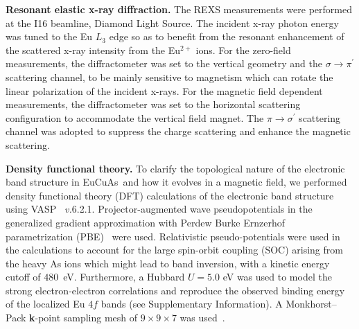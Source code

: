 \documentclass[aps,prl,amsmath,amssymb,amstext,citeautoscript,punctuation,nofootinbib,superscriptaddress,twocolumn]{revtex4-1}
\newcommand{\eca}{EuCuAs}
\begin{document}
\textbf{Resonant elastic x-ray diffraction.}
The REXS measurements were performed at the I16 beamline, Diamond Light Source. The incident x-ray photon energy was tuned to the Eu $L_3$ edge so as to benefit from the resonant enhancement of the scattered x-ray intensity from the Eu$^{2+}$ ions. For the zero-field measurements, the diffractometer was set to the vertical geometry and the $\sigma$$\to$$\pi^\prime$ scattering channel, to be mainly sensitive to magnetism which can rotate the linear polarization of the incident x-rays. For the magnetic field dependent measurements, the diffractometer was set to the horizontal scattering configuration to accommodate the vertical field magnet. The $\pi$$\to$$\sigma^\prime$ scattering channel was adopted to suppress the charge scattering and enhance the magnetic scattering.
 
\textbf{Density functional theory.} To clarify the topological nature of the electronic band structure in \eca\, and how it evolves in a magnetic field, we performed density functional theory (DFT) calculations of the electronic band structure using VASP~\cite{VASP1,VASP2} \textit{v.}6.2.1. Projector-augmented wave pseudopotentials in the generalized gradient approximation with Perdew Burke Ernzerhof parametrization (PBE)~\cite{Perdew96} were used. Relativistic pseudo-potentials were used in the calculations to account for the large spin-orbit coupling (SOC) arising from the heavy As ions which might lead to band inversion, with a kinetic energy cutoff of $480$~eV. Furthermore, a Hubbard $U = 5.0$ eV was used to model the strong electron-electron correlations and reproduce the observed binding energy of the localized Eu $4f$ bands (see Supplementary Information). A Monkhorst–Pack \textbf{k}-point sampling mesh of $9\times9\times7$ was used~\cite{PhysRevB.13.5188}.

\end{document}
